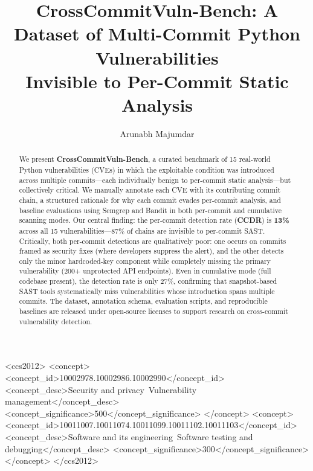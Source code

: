 \documentclass[sigconf,review]{acmart}
\newcommand{\NUMCVES}{15}
\newcommand{\CCDR}{13\%}                %
\newcommand{\CDR}{27\%}                 %
\begin{document}
\title{CrossCommitVuln-Bench: A Dataset of Multi-Commit Python Vulnerabilities\\Invisible to Per-Commit Static Analysis}

\author{Arunabh Majumdar}
\email{---}

\begin{abstract}
We present \textbf{CrossCommitVuln-Bench}, a curated benchmark of \NUMCVES{} real-world Python vulnerabilities
(CVEs) in which the exploitable condition was introduced across multiple commits—each
individually benign to per-commit static analysis—but collectively critical.
We manually annotate each CVE with its contributing commit chain, a structured rationale
for why each commit evades per-commit analysis, and baseline evaluations using Semgrep and Bandit
in both per-commit and cumulative scanning modes.
Our central finding: the per-commit detection rate (\textbf{CCDR}) is \textbf{\CCDR{}} across all
\NUMCVES{} vulnerabilities---87\% of chains are invisible to per-commit SAST.
Critically, both per-commit detections are qualitatively poor:
one occurs on commits framed as security fixes (where developers suppress the alert),
and the other detects only the minor hardcoded-key component while completely missing
the primary vulnerability (200+ unprotected API endpoints).
Even in cumulative mode (full codebase present), the detection rate is only \CDR{},
confirming that snapshot-based SAST tools systematically miss vulnerabilities
whose introduction spans multiple commits.
The dataset, annotation schema, evaluation scripts, and reproducible baselines are
released under open-source licenses to support research on cross-commit vulnerability detection.
\end{abstract}

\begin{CCSXML}
<ccs2012>
<concept>
<concept_id>10002978.10002986.10002990</concept_id>
<concept_desc>Security and privacy~Vulnerability management</concept_desc>
<concept_significance>500</concept_significance>
</concept>
<concept>
<concept_id>10011007.10011074.10011099.10011102.10011103</concept_id>
<concept_desc>Software and its engineering~Software testing and debugging</concept_desc>
<concept_significance>300</concept_significance>
</concept>
</ccs2012>
\end{CCSXML}

\end{document}
